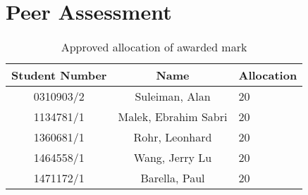 \section{Peer Assessment}

\begin{table}[h]
\centering
\begin{tabular}{|c|c|l|}
	\hline
	\textbf{Student Number} & \textbf{Name} & \textbf{Allocation} \\ \hline
	0310903/2 & Suleiman, Alan & 20 \\ \hline
	1134781/1 & Malek, Ebrahim Sabri & 20 \\ \hline
	1360681/1 & Rohr, Leonhard & 20 \\ \hline
	1464558/1 & Wang, Jerry Lu & 20 \\ \hline
	1471172/1 & Barella, Paul &  20 \\ \hline
\end{tabular}
\caption{Approved allocation of awarded mark}
\end{table}